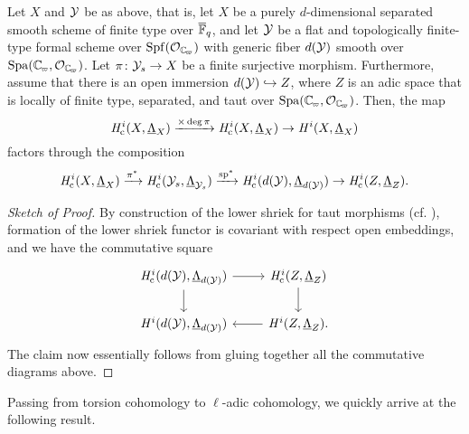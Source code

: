 \documentclass[../main.tex]{subfiles}
\begin{document}
\begin{prop}\label{thm:SubspaceInjectionFiniteLevel}
  Let $X$ and $\mathcal{Y}$ be as above, that is, let $X$ be a purely $d$-dimensional
  separated smooth scheme of finite type over ${\overline {\mathbb{F}}_q}$, and let $\mathcal{Y}$ be a flat and topologically finite-type formal scheme over $\Spf(\cO_\Cp)$ with generic fiber $d(\mathcal{Y})$ smooth over $\spa(\Cp,\cO_\Cp)$.
  Let $\pi\colon \mathcal{Y}_s \to X$ be a finite surjective morphism.
  Furthermore, assume that there is an open immersion
  $d(\mathcal{Y}) \hookrightarrow Z$, where
  $Z$ is an adic space that is locally of finite type, separated, and taut over $\spa(\Cp, \cO_\Cp)$.
  Then, the map 
  \begin{equation*}
    \mathit H_{\mathrm{c}}^i(X, \underline \Lambda_X) \xrightarrow{\times \deg \pi} 
    \mathit H_{\mathrm{c}}^i(X, \underline \Lambda_X) \to 
    \mathit H^i(X,   \underline \Lambda_X)
  \end{equation*}
  factors through the composition
  \begin{equation*}
    \mathit H_{\mathrm{c}}^i(X,      \underline \Lambda_X) \xrightarrow{\pi^*}
    \mathit H_{\mathrm{c}}^i(\mathcal{Y}_s,  \underline \Lambda_{\mathcal{Y}_s}) \xrightarrow{\mathrm{sp}^*}
    \mathit H_{\mathrm{c}}^i(d(\mathcal{Y}), \underline \Lambda_{d(\mathcal{Y})}) \to 
    \mathit H_{\mathrm{c}}^i(Z,      \underline \Lambda_Z).
  \end{equation*}
\begin{proof}[Sketch of Proof]
  By construction of the lower shriek for taut morphisms (cf. \cite[§0.4
  D)]{huber2013etale}), formation of the lower shriek functor is covariant with
  respect open embeddings, and we have the commutative square
  \begin{equation*}
    \begin{tikzcd}[ampersand replacement=\&]
      {\hHc^i(d(\cY), \underline \Lambda_{d(\cY)})} \& 
      {\hHc^i(Z, \underline \Lambda_{Z})} \\
    	{\hH^i(d(\cY), \underline \Lambda_{d(\cY)})} \& 
      {\hH^i(Z, \underline \Lambda_{Z})}.
    	\arrow[from=1-1, to=1-2]
    	\arrow[from=1-1, to=2-1]
    	\arrow[from=1-2, to=2-2]
    	\arrow[from=2-2, to=2-1]
    \end{tikzcd}
  \end{equation*}
  The claim now essentially follows from gluing together all the commutative diagrams above. 
\end{proof}
\end{prop}

Passing from torsion cohomology to $\ell$-adic cohomology, we quickly arrive at the following result.
\end{document}
